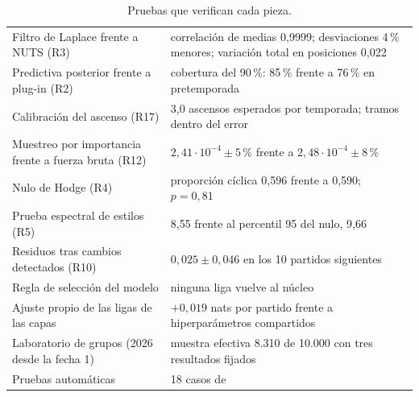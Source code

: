 \begin{table}[h]
\centering
\caption{Pruebas que verifican cada pieza.}
\label{tab:validaciones}
\small
\begin{tabularx}{\textwidth}{@{}p{5.4cm}L@{}}
\toprule
{} &  \\
\midrule
Filtro de Laplace frente a NUTS (R3) & correlación de medias 0,9999; desviaciones 4\,\% menores; variación total en posiciones 0,022 \\
Predictiva posterior frente a plug-in (R2) & cobertura del 90\,\%: 85\,\% frente a 76\,\% en pretemporada \\
Calibración del ascenso (R17) & 3,0 ascensos esperados por temporada; tramos dentro del error \\
Muestreo por importancia frente a fuerza bruta (R12) & $2{,}41\cdot10^{-4}\pm5$\,\% frente a $2{,}48\cdot10^{-4}\pm8$\,\% \\
Nulo de Hodge (R4) & proporción cíclica 0,596 frente a 0,590; $p=0{,}81$ \\
Prueba espectral de estilos (R5) & 8,55 frente al percentil 95 del nulo, 9,66 \\
Residuos tras cambios detectados (R10) & $0{,}025\pm0{,}046$ en los 10 partidos siguientes \\
Regla de selección del modelo & ninguna liga vuelve al núcleo \\
Ajuste propio de las ligas de las capas & $+0{,}019$ nats por partido frente a hiperparámetros compartidos \\
Laboratorio de grupos (2026 desde la fecha 1) & muestra efectiva 8.310 de 10.000 con tres resultados fijados \\
Pruebas automáticas & 18 casos de  \\
\bottomrule
\end{tabularx}
\end{table}
